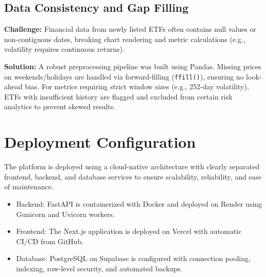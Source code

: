 \subsection{Data Consistency and Gap Filling}
\textbf{Challenge:} Financial data from newly listed ETFs often contains null values or non-contiguous dates, breaking chart rendering and metric calculations (e.g., volatility requires continuous returns).

\textbf{Solution:} A robust preprocessing pipeline was built using Pandas. Missing prices on weekends/holidays are handled via forward-filling (\texttt{ffill()}), ensuring no look-ahead bias. For metrics requiring strict window sizes (e.g., 252-day volatility), ETFs with insufficient history are flagged and excluded from certain risk analytics to prevent skewed results.


\section{Deployment Configuration}

The platform is deployed using a cloud-native architecture with clearly separated frontend, backend, and database services to ensure scalability, reliability, and ease of maintenance.

\begin{itemize}
    \item {Backend:} FastAPI is containerized with Docker and deployed on Render using Gunicorn and Uvicorn workers.
    \item {Frontend:} The Next.js application is deployed on Vercel with automatic CI/CD from GitHub.
    \item {Database:} PostgreSQL on Supabase is configured with connection pooling, indexing, row-level security, and automated backups.
\end{itemize}




